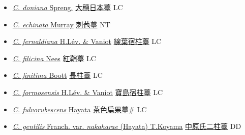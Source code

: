 \begin{itemize}
\begin{itemize}
        \item[] \href{http://www.theplantlist.org/tpl1.1/search?q=Carex+doniana}{\textit{C. doniana} Spreng.}   \href{\detokenize{http://taibnet.sinica.edu.tw/chi/taibnet_species_list.php?T2=大穗日本薹&T2_new_value=true&fr=y}}{大穗日本薹} LC
        \item[] \href{http://www.theplantlist.org/tpl1.1/search?q=Carex+echinata}{\textit{C. echinata} Murray}   \href{\detokenize{http://taibnet.sinica.edu.tw/chi/taibnet_species_list.php?T2=刺苞薹&T2_new_value=true&fr=y}}{刺苞薹} NT
        \item[] \href{http://www.theplantlist.org/tpl1.1/search?q=Carex+fernaldiana}{\textit{C. fernaldiana} H.Lév. \& Vaniot}   \href{\detokenize{http://taibnet.sinica.edu.tw/chi/taibnet_species_list.php?T2=線葉宿柱薹&T2_new_value=true&fr=y}}{線葉宿柱薹} LC
        \item[] \href{http://www.theplantlist.org/tpl1.1/search?q=Carex+filicina}{\textit{C. filicina} Nees}   \href{\detokenize{http://taibnet.sinica.edu.tw/chi/taibnet_species_list.php?T2=紅鞘薹&T2_new_value=true&fr=y}}{紅鞘薹} LC
        \item[] \href{http://www.theplantlist.org/tpl1.1/search?q=Carex+finitima}{\textit{C. finitima} Boott}   \href{\detokenize{http://taibnet.sinica.edu.tw/chi/taibnet_species_list.php?T2=長柱薹&T2_new_value=true&fr=y}}{長柱薹} LC
        \item[] \href{http://www.theplantlist.org/tpl1.1/search?q=Carex+formosensis}{\textit{C. formosensis} H.Lév. \& Vaniot}   \href{\detokenize{http://taibnet.sinica.edu.tw/chi/taibnet_species_list.php?T2=寶島宿柱薹&T2_new_value=true&fr=y}}{寶島宿柱薹} LC
        \item[] \href{http://www.theplantlist.org/tpl1.1/search?q=Carex+fulvorubescens}{\textit{C. fulvorubescens} Hayata}   \href{\detokenize{http://taibnet.sinica.edu.tw/chi/taibnet_species_list.php?T2=茶色扁果薹&T2_new_value=true&fr=y}}{茶色扁果薹}\# LC
        \item[] \href{http://www.theplantlist.org/tpl1.1/search?q=Carex+gentilis+var.+nakaharae}{\textit{C. gentilis} Franch. var. \textit{nakaharae} (Hayata) T.Koyama}   \href{\detokenize{http://taibnet.sinica.edu.tw/chi/taibnet_species_list.php?T2=中原氏二柱薹&T2_new_value=true&fr=y}}{中原氏二柱薹} DD

\end{itemize}
\end{itemize}
